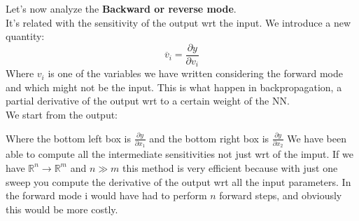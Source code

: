 Let's now analyze the \textbf{Backward or reverse mode}.\\
It's related with the sensitivity of the output wrt the input. We introduce a new quantity:
\[
    \overline{v}_i = \dfrac{\partial y}{\partial v_i}   
\]
Where $v_i$ is one of the variables we have written considering the forward mode and which might not be the input. This is what happen in backpropagation, a partial derivative of the output wrt to a certain weight of the NN.\\
We start from the output:
\begin{center}
\end{center}
Where the bottom left box is $\frac{\partial y}{\partial x_{1}}$ and the bottom right box is $\frac{\partial y}{\partial x_{2}}$
We have been able to compute all the intermediate sensitivities not just wrt of the imput. If we have $\mathbb{R}^n \to \mathbb{R}^m$ and $n \gg m$ this method is very efficient because with just one sweep you compute the derivative of the output wrt all the input parameters. In the forward mode i would have had to perform $n$ forward steps, and obviously this would be more costly.

